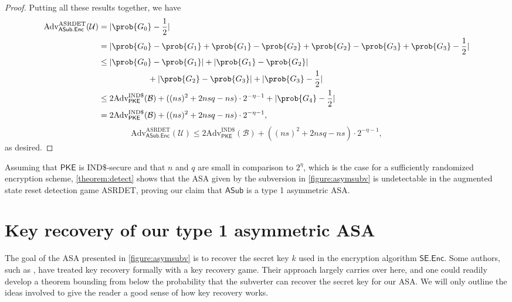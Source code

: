 \begin{proof}
Putting all these results together, we have
\iffullversion
\begin{align*}
\text{Adv}^\text{ASRDET}_\mathsf{ASub.Enc}(\mathcal{U})
&= |\prob{G_0}-\frac{1}{2}| \\
&= |\prob{G_0}-\prob{G_1}+\prob{G_1}-\prob{G_2}+\prob{G_2}-\prob{G_3}+\prob{G_3}-\frac{1}{2}| \\
&\le |\prob{G_0}-\prob{G_1}|+|\prob{G_1}-\prob{G_2}|\\
&\qquad\qquad\qquad +|\prob{G_2}-\prob{G_3}|+|\prob{G_3}-\frac{1}{2}| \\
&\le 2\text{Adv}^{\text{IND\$}}_\mathsf{PKE}(\mathcal{B}) + ((ns)^2+2nsq-ns)\cdot 2^{-\eta-1} + |\prob{G_4}-\frac{1}{2}|\\
&= 2\text{Adv}^{\text{IND\$}}_\mathsf{PKE}(\mathcal{B}) + ((ns)^2+2nsq-ns)\cdot 2^{-\eta-1},
\end{align*}
\else
\[
\text{Adv}^\text{ASRDET}_\mathsf{ASub.Enc}(\mathcal{U})\le 2\text{Adv}^{\text{IND\$}}_\mathsf{PKE}(\mathcal{B}) + ((ns)^2+2nsq-ns)\cdot 2^{-\eta-1},
\]
\fi
as desired.
\end{proof}

Assuming that $\mathsf{PKE}$ is IND\$-secure and that $n$ and $q$ are small in comparison to $2^{\eta}$, which is the case for a sufficiently randomized encryption scheme, \autoref{theorem:detect} shows that the ASA given by the subversion in \autoref{figure:asymsubv} is undetectable in the augmented state reset detection game ASRDET, proving our claim that $\mathsf{ASub}$ is a type 1 asymmetric ASA.


\section{Key recovery of our type 1 asymmetric ASA} \label{sec:keyrec1}
The goal of the ASA presented in \autoref{figure:asymsubv} is to recover the secret key $k$ used in the encryption algorithm $\mathsf{SE.Enc}$. Some authors, such as \cite{CCS:BelJaeKan15}, have treated key recovery formally with a key recovery game. Their approach largely carries over here, and one could readily develop a theorem bounding from below the probability that the subverter can recover the secret key for our ASA. We will only outline the ideas involved to give the reader a good sense of how key recovery works.

